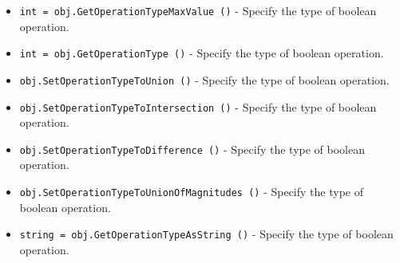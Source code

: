 \begin{itemize}
\item  \verb|int = obj.GetOperationTypeMaxValue ()| -  Specify the type of boolean operation.

\item  \verb|int = obj.GetOperationType ()| -  Specify the type of boolean operation.

\item  \verb|obj.SetOperationTypeToUnion ()| -  Specify the type of boolean operation.

\item  \verb|obj.SetOperationTypeToIntersection ()| -  Specify the type of boolean operation.

\item  \verb|obj.SetOperationTypeToDifference ()| -  Specify the type of boolean operation.

\item  \verb|obj.SetOperationTypeToUnionOfMagnitudes ()| -  Specify the type of boolean operation.

\item  \verb|string = obj.GetOperationTypeAsString ()| -  Specify the type of boolean operation.

\end{itemize}
